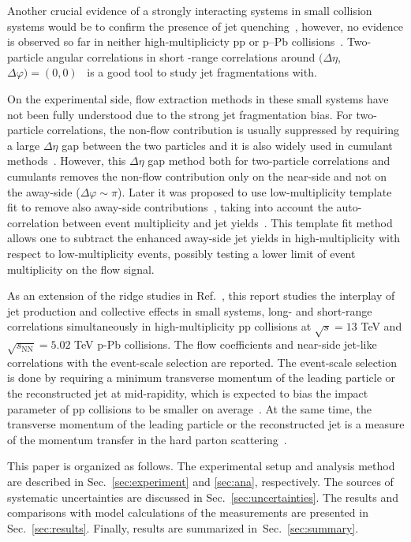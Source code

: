 Another crucial evidence of a strongly interacting systems in small collision systems would be to confirm the presence of jet quenching~\cite{Gyulassy:1990ye,Wang:1991xy}, however, no evidence is observed so far in neither high-multiplicicty pp or p--Pb collisions~\cite{Adam:2014qja,Khachatryan:2016odn,Adam:2016jfp,Adam:2016dau,Acharya:2017okq}. Two-particle angular correlations in short -range correlations around $(\Delta\eta$, $\Delta\varphi)=(0,0)$~\cite{Adam:2016tsv} is a good tool to study jet fragmentations with.

On the experimental side, flow extraction methods in these small systems have not been fully understood due to the strong jet fragmentation bias. 
For two-particle correlations, the non-flow contribution is usually suppressed by requiring a large $\Delta\eta$ gap between the two particles and it is also widely used in cumulant methods~\cite{Bilandzic:2010jr, Acharya:2019vdf}. However, this $\Delta\eta$ gap method both for two-particle correlations and cumulants removes the non-flow contribution only on the near-side and not on the away-side ($\Delta\varphi\sim\pi$). Later it was proposed to use low-multiplicity template fit to remove also away-side contributions~\cite{ATLAS:2015hzw,ATLAS:2016yzd,ATLAS:2018ngv}, taking into account the auto-correlation between event multiplicity and jet yields~\cite{CMS:2013ycn}. This template fit method allows one to subtract the enhanced away-side jet yields in high-multiplicity with respect to low-multiplicity events, possibly testing a lower limit of event multiplicity on the flow signal.

As an extension of the ridge studies in Ref.~\cite{ALICE:2021nir}, this report studies the interplay of jet production and collective effects in small systems, long- and short-range correlations simultaneously in high-multiplicity pp collisions at $\sqrt{s} =13$ TeV and $\sqrt{s_{\mathrm{NN}}}=5.02$ TeV p-Pb collisions. The flow coefficients and near-side jet-like correlations with the event-scale selection are reported. The event-scale selection is done by requiring a minimum transverse momentum of the leading particle or the reconstructed jet at mid-rapidity, which is expected to bias the impact parameter of pp collisions to be smaller on average~\cite{Sjostrand:1986ep,Frankfurt:2003td,Frankfurt:2010ea}. At the same time, the transverse momentum of the leading particle or the reconstructed jet is a measure of the momentum transfer in the hard parton scattering~\cite{Chatrchyan:2012tt,Chatrchyan:2011id}.

This paper is organized as follows. The experimental setup and analysis method are described in Sec.~\ref{sec:experiment} and \ref{sec:ana}, respectively. The sources of systematic uncertainties are discussed in Sec.~\ref{sec:uncertainties}. The results and comparisons with model calculations of the measurements are presented in Sec.~\ref{sec:results}. Finally, results are summarized in~Sec.~\ref{sec:summary}.

 